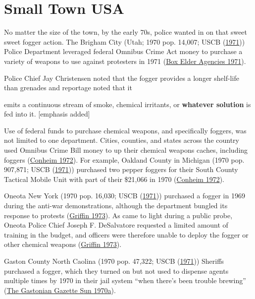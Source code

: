 \documentclass[
  11pt,
]{krantz}
\renewenvironment{quote}{\begin{VF}}{\end{VF}}
\begin{document}
\hypertarget{small-town-usa}{%
\section{Small Town USA}\label{small-town-usa}}

No matter the size of the town, by the early 70s, police wanted in on that sweet sweet fogger action.
The Brigham City (Utah; 1970 pop. 14,007; USCB (\protect\hyperlink{ref-USCB1970}{1971})) Police Department leveraged federal Omnibus Crime Act money to purchase a variety of weapons to use against protesters in 1971 (\protect\hyperlink{ref-BoxElderAgencies1971}{Box Elder Agencies 1971}).

Police Chief Jay Christensen noted that the fogger provides a longer shelf-life than grenades and reportage noted that it

\begin{quote}
emits a continuous stream of smoke, chemical irritants, or \textbf{whatever solution} is fed into it. {[}emphasis added{]}

\end{quote}

Use of federal funds to purchase chemical weapons, and specifically foggers, was not limited to one department.
Cities, counties, and states across the country used Omnibus Crime Bill money to up their chemical weapons caches, including foggers (\protect\hyperlink{ref-Conheim1972}{Conheim 1972}).
For example, Oakland County in Michigan (1970 pop. 907,871; USCB (\protect\hyperlink{ref-USCB1970}{1971})) purchased two pepper foggers for their South County Tactical Mobile Unit with part of their \$21,066 in 1970 (\protect\hyperlink{ref-Conheim1972}{Conheim 1972}).

Oneota New York (1970 pop. 16,030; USCB (\protect\hyperlink{ref-USCB1970}{1971})) purchased a fogger in 1969 during the anti-war demonstrations, although the department bungled its response to protests (\protect\hyperlink{ref-Griffin1973}{Griffin 1973}).
As came to light during a public probe, Oneota Police Chief Joseph F. DeSalvatore requested a limited amount of training in the budget, and officers were therefore unable to deploy the fogger or other chemical weapons (\protect\hyperlink{ref-Griffin1973}{Griffin 1973}).

Gaston County North Caolina (1970 pop. 47,322; USCB (\protect\hyperlink{ref-USCB1970}{1971})) Sheriffs purchased a fogger, which they turned on but not used to dispense agents multiple times by 1970 in their jail system ``when there's been trouble brewing'' (\protect\hyperlink{ref-Balloch1970}{The Gastonian Gazette Sun 1970a}).
\end{document}
